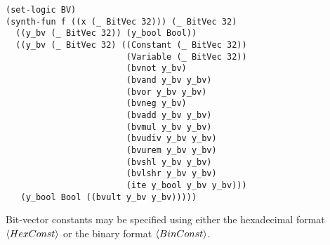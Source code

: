 \documentclass[english,a4paper,10pt]{article}
\begin{document}
\begin{appendix}
\begin{comment}
\begin{lstlisting}[language=SyGuS]
(set-logic BV)
(synth-fun f ((x (_ BitVec 32))) (_ BitVec 32)
  ((y_bv (_ BitVec 32)) (y_bool Bool))
  ((y_bv (_ BitVec 32) ((Constant (_ BitVec 32))
                           (Variable (_ BitVec 32))
                           (bvnot y_bv)
                           (bvand y_bv y_bv)
                           (bvor y_bv y_bv)
                           (bvneg y_bv)
                           (bvadd y_bv y_bv)
                           (bvmul y_bv y_bv)
                           (bvudiv y_bv y_bv)
                           (bvurem y_bv y_bv)
                           (bvshl y_bv y_bv)
                           (bvlshr y_bv y_bv)
                           (bvnand y_bv y_bv)
                           (bvnor y_bv y_bv)
                           (bvxor y_bv y_bv)
                           (bvxnor y_bv y_bv)
                           (bvsub y_bv y_bv)
                           (bvsdiv y_bv y_bv)
                           (bvsrem y_bv y_bv)
                           (bvsmod y_bv y_bv)
                           (bvashr y_bv y_bv)
                           (ite y_bool y_bv y_bv)))
    (y_bool Bool (...
                  (bvult y_bv y_bv)
                  (bvule y_bv y_bv)
                  (bvugt y_bv y_bv)
                  (bvuge y_bv y_bv)
                  (bvslt y_bv y_bv)
                  (bvsle y_bv y_bv)
                  (bvsgt y_bv y_bv)
                  (bvsge y_bv y_bv))))))
\end{lstlisting}
\end{comment}
\begin{lstlisting}[language=SyGuS]
(set-logic BV)
(synth-fun f ((x (_ BitVec 32))) (_ BitVec 32)
  ((y_bv (_ BitVec 32)) (y_bool Bool))
  ((y_bv (_ BitVec 32) ((Constant (_ BitVec 32))
                        (Variable (_ BitVec 32))
                        (bvnot y_bv)
                        (bvand y_bv y_bv)
                        (bvor y_bv y_bv)
                        (bvneg y_bv)
                        (bvadd y_bv y_bv)
                        (bvmul y_bv y_bv)
                        (bvudiv y_bv y_bv)
                        (bvurem y_bv y_bv)
                        (bvshl y_bv y_bv)
                        (bvlshr y_bv y_bv)
                        (ite y_bool y_bv y_bv)))
   (y_bool Bool ((bvult y_bv y_bv)))))
\end{lstlisting}
Bit-vector constants may be specified
using either the hexadecimal format $\left\langle HexConst\right\rangle$
or the binary format $\left\langle BinConst\right\rangle$.



\end{appendix}
\end{document}
